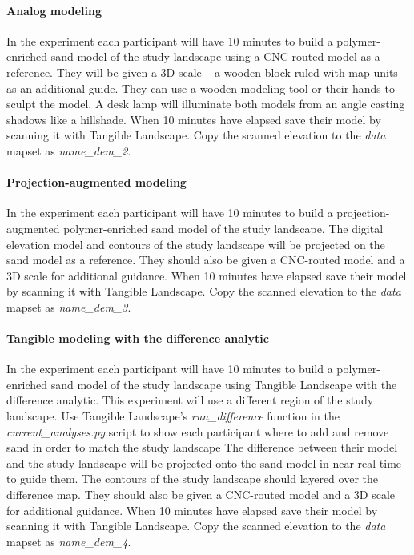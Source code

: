 \documentclass[prodmode,acmtochi]{acmsmall} %
\begin{document}
\paragraph{Analog modeling}
In the  experiment
each participant will have 10 minutes to build a polymer-enriched sand model
of the study landscape using a CNC-routed model as a reference. 
They will be given a 3D scale 
-- a wooden block ruled with map units -- 
as an additional guide. 
They can use a wooden modeling tool or their hands to sculpt the model.  
A desk lamp will illuminate both models from an angle
casting shadows like a hillshade. 
%
When 10 minutes have elapsed 
save their model by scanning it with Tangible Landscape.
Copy the scanned elevation to the \emph{data} mapset
as \emph{name{\_}dem{\_}2}.

\paragraph{Projection-augmented modeling}
In the  experiment
each participant will have 10 minutes to build 
a projection-augmented polymer-enriched sand model
of the study landscape.
The digital elevation model and contours of the study landscape 
will be projected on the sand model as a reference. 
They should also be given a CNC-routed model 
and a 3D scale for additional guidance. 
%
When 10 minutes have elapsed 
save their model by scanning it with Tangible Landscape.
Copy the scanned elevation to the \emph{data} mapset
as \emph{name{\_}dem{\_}3}.

\paragraph{Tangible modeling with the difference analytic}
In the  experiment
each participant will have 10 minutes to build 
a polymer-enriched sand model
of the study landscape 
using Tangible Landscape with the difference analytic.
This experiment will use a different region of the study landscape. 
Use Tangible Landscape's \emph{run{\_}difference} function 
in the \emph{current{\_}analyses.py} script 
to show each participant where to add and remove sand 
in order to match the study landscape
The difference between their model and the study landscape
will be projected onto the sand model in near real-time
to guide them. 
The contours of the study landscape should layered
over the difference map. 
They should also be given a CNC-routed model 
and a 3D scale for additional guidance. 
%
When 10 minutes have elapsed 
save their model by scanning it with Tangible Landscape.
Copy the scanned elevation to the \emph{data} mapset
as \emph{name{\_}dem{\_}4}.
\end{document}
